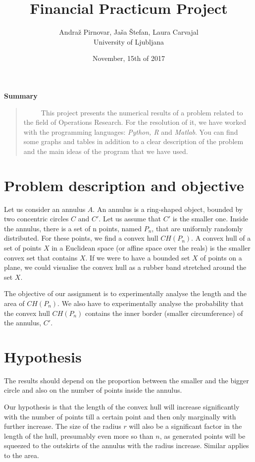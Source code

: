 \documentclass[12pt,a4paper]{article}
\begin{document}
\title{\bf Financial Practicum Project }
\author{Andraž Pirnovar, Jaša Štefan, Laura Carvajal  \\ University of Ljubljana}
\date{November, 15th of 2017}
\maketitle{}
\begin{center}
{\small{\bf Summary}}\end{center}
\begin{quote}
{\small 
\ \ \ \ \ This project presents the numerical results of a problem related to the field of Operations Research. For the resolution of it, we have worked with the programming languages: \textit{Python, R} and \textit{Matlab}. You can find some graphs and tables in addition to a clear description of the problem and the main ideas of the program that we have used.}
\end{quote}
\bigskip 
\section{Problem description and objective}
Let us consider an annulus $A$. An annulus is a ring-shaped object, bounded by two concentric circles $C$ and $C'$. Let us assume that $C'$ is the smaller one. Inside the annulus, there is a set of n points, named $P_n$, that are uniformly randomly distributed. For these points, we find a convex hull $CH(P_n)$. A convex hull of a set of points $X$ in a Euclidean space (or affine space over the reals) is the smaller convex set that contains $X$. If we were to have a bounded set $X$ of points on a plane, we could visualise the convex hull as a rubber band stretched around the set $X$. \medskip 
 
The objective of our assignment is to experimentally analyse the length and the area of $CH(P_n)$. We also have to experimentally analyse the probability that the convex hull $CH(P_n)$ contains the inner border (smaller circumference) of the annulus, $C'$. 
\pagebreak 

\section{Hypothesis}
The results should depend on the proportion between the smaller and the bigger circle and also on the number of points inside the annulus.\medskip  
 
Our hypothesis is that the length of the convex hull will increase significantly with the number of points till a certain point and then only marginally with further increase. The size of the radius $r$ will also be a significant factor in the length of the hull, presumably even more so than $n$, as generated points will be squeezed to the outskirts of the annulus with the radius increase. Similar applies to the area.  \medskip 
 
\end{document}
